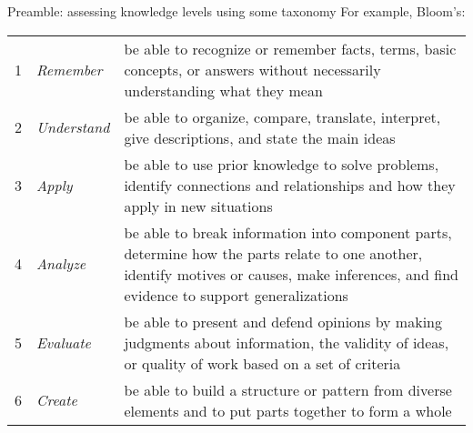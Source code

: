 \begin{frame}{Preamble: assessing knowledge levels using some taxonomy}
	For example, Bloom's:
	\begin{center}
	\begin{small}
	\begin{tabular}{|llp{}|}
		\hline
		1 & \emph{Remember} & be able to recognize or remember facts, terms, basic concepts, or answers without necessarily understanding what they mean \\
		2 & \emph{Understand} & be able to organize, compare, translate, interpret, give descriptions, and state the main ideas \\
		3 & \emph{Apply} & be able to use prior knowledge to solve problems, identify connections and relationships and how they apply in new situations \\
		4 & \emph{Analyze} & be able to break information into component parts, determine how the parts relate to one another, identify motives or causes, make inferences, and find evidence to support generalizations \\
		5 & \emph{Evaluate} & be able to present and defend opinions by making judgments about information, the validity of ideas, or quality of work based on a set of criteria \\
		6 & \emph{Create} & be able to build a structure or pattern from diverse elements and to put parts together to form a whole \\
		\hline
	\end{tabular}
	\end{small}
	\end{center}
\end{frame}


